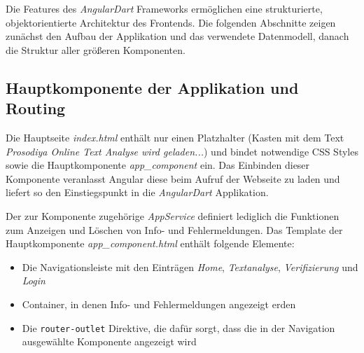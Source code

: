 Die Features des \textit{AngularDart} Frameworks ermöglichen eine strukturierte, objektorientierte Architektur des Frontends. Die folgenden Abschnitte zeigen zunächst den Aufbau der Applikation und das verwendete Datenmodell, danach die Struktur aller größeren Komponenten.

\subsection{Hauptkomponente der Applikation und Routing}

Die Hauptseite \textit{index.html} enthält nur einen Platzhalter (Kasten mit dem Text \textit{Prosodiya Online Text Analyse wird geladen...}) und bindet notwendige CSS Styles sowie die Hauptkomponente \textit{app\_component} ein. Das Einbinden dieser Komponente veranlasst Angular diese beim Aufruf der Webseite zu laden und liefert so den Einstiegspunkt in die \textit{AngularDart} Applikation.

Der zur Komponente zugehörige \textit{AppService} definiert lediglich die Funktionen zum Anzeigen und Löschen von Info- und Fehlermeldungen. Das Template der Hauptkomponente \textit{app\_component.html} enthält folgende Elemente:
\begin{itemize}
	\item Die Navigationsleiste mit den Einträgen \textit{Home}, \textit{Textanalyse}, \textit{Verifizierung} und \textit{Login}
	
	\item Container, in denen Info- und Fehlermeldungen angezeigt erden
	\item Die \texttt{router-outlet} Direktive, die dafür sorgt, dass die in der Navigation ausgewählte Komponente angezeigt wird
\end{itemize}

